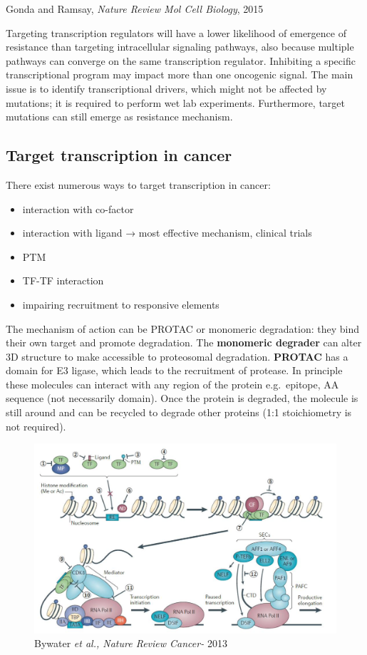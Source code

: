 Gonda and Ramsay, \emph{Nature Review Mol Cell Biology}, 2015

Targeting transcription regulators will have a lower likelihood of emergence of resistance than targeting intracellular signaling pathways, also because multiple pathways can converge on the same transcription regulator. Inhibiting a specific transcriptional program may impact more than one oncogenic signal. The main issue is to identify transcriptional drivers, which might not be affected by mutations; it is required to perform wet lab experiments. Furthermore, target mutations can still emerge as resistance mechanism.

\hypertarget{target-transcription-in-cancer}{%
\subsection{Target transcription in cancer}\label{target-transcription-in-cancer}}

There exist numerous ways to target transcription in cancer:

\begin{itemize}
\tightlist
\item
  interaction with co-factor
\item
  interaction with ligand → most effective mechanism, clinical trials
\item
  PTM
\item
  TF-TF interaction
\item
  impairing recruitment to responsive elements
\end{itemize}

The mechanism of action can be PROTAC or monomeric degradation: they bind their own target and promote degradation. The \textbf{monomeric degrader} can alter 3D structure to make accessible to proteosomal degradation. \textbf{PROTAC} has a domain for E3 ligase, which leads to the recruitment of protease. In principle these molecules can interact with any region of the protein e.g.~epitope, AA sequence (not necessarily domain). Once the protein is degraded, the molecule is still around and can be recycled to degrade other proteins (1:1 stoichiometry is not required).

\begin{figure}
\centering
\includegraphics{../_resources/Screen_Shot_2022-11-04_at_11-55-34.png}
\caption{Bywater \emph{et al., Nature Review Cancer-} 2013}
\end{figure}

